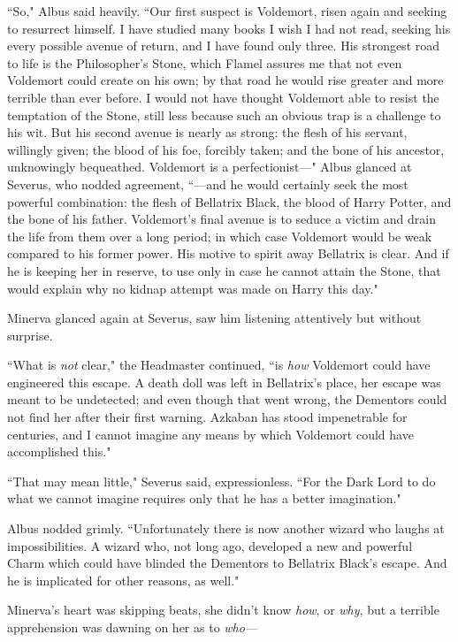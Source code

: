 ``So," Albus said heavily. ``Our first suspect is Voldemort, risen again and seeking to resurrect himself. I have studied many books I wish I had not read, seeking his every possible avenue of return, and I have found only three. His strongest road to life is the Philosopher's Stone, which Flamel assures me that not even Voldemort could create on his own; by that road he would rise greater and more terrible than ever before. I would not have thought Voldemort able to resist the temptation of the Stone, still less because such an obvious trap is a challenge to his wit. But his second avenue is nearly as strong: the flesh of his servant, willingly given; the blood of his foe, forcibly taken; and the bone of his ancestor, unknowingly bequeathed. Voldemort is a perfectionist—" Albus glanced at Severus, who nodded agreement, ``—and he would certainly seek the most powerful combination: the flesh of Bellatrix Black, the blood of Harry Potter, and the bone of his father. Voldemort's final avenue is to seduce a victim and drain the life from them over a long period; in which case Voldemort would be weak compared to his former power. His motive to spirit away Bellatrix is clear. And if he is keeping her in reserve, to use only in case he cannot attain the Stone, that would explain why no kidnap attempt was made on Harry this day."

Minerva glanced again at Severus, saw him listening attentively but without surprise.

``What is \emph{not} clear," the Headmaster continued, ``is \emph{how} Voldemort could have engineered this escape. A death doll was left in Bellatrix's place, her escape was meant to be undetected; and even though that went wrong, the Dementors could not find her after their first warning. Azkaban has stood impenetrable for centuries, and I cannot imagine any means by which Voldemort could have accomplished this."

``That may mean little," Severus said, expressionless. ``For the Dark Lord to do what we cannot imagine requires only that he has a better imagination."

Albus nodded grimly. ``Unfortunately there is now another wizard who laughs at impossibilities. A wizard who, not long ago, developed a new and powerful Charm which could have blinded the Dementors to Bellatrix Black's escape. And he is implicated for other reasons, as well."

Minerva's heart was skipping beats, she didn't know \emph{how}, or \emph{why}, but a terrible apprehension was dawning on her as to \emph{who—}

